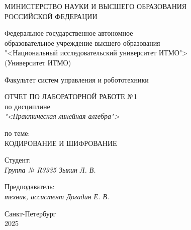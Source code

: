 \thispagestyle{empty}

\begin{center}
    МИНИСТЕРСТВО НАУКИ И ВЫСШЕГО ОБРАЗОВАНИЯ \\ РОССИЙСКОЙ ФЕДЕРАЦИИ

    \vspace{20pt}

    Федеральное государственное автономное \\ образовательное учреждение высшего образования \\
    "<Национальный исследовательский университет ИТМО"> \\
    (Университет ИТМО)

    \vspace{20pt}

    Факультет систем управления и робототехники
\end{center}

\vfill

\begin{center}
    ОТЧЕТ ПО ЛАБОРАТОРНОЙ РАБОТЕ №1\\  
    по дисциплине \\
    \textit{"<Практическая линейная алгебра">}

    \vspace{20pt}

    по теме: \\
    \uppercase{Кодирование и шифрование}
\end{center}

\vfill

    \noindent Студент: \\
    \textit{Группа № R3335 \hfill Зыкин Л. В.}

    \vspace{20pt}

    \noindent Предподаватель: \\
    \textit{техник, ассистент \hfill Догадин Е. В.}

\vfill

\begin{center}
    Санкт-Петербург \\ 2025
\end{center}